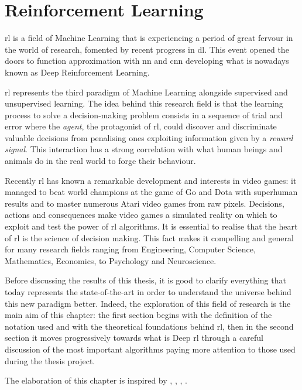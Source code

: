 
\chapter{Reinforcement Learning}

\acrfull{rl} is a field of Machine Learning that is experiencing a period of great fervour in the world of research, fomented by recent progress in \acrfull{dl}. This event opened the doors to function approximation with \acrfull{nn} and \acrfull{cnn} developing what is nowadays known as Deep Reinforcement Learning.

\acrshort{rl} represents the third paradigm of Machine Learning alongside supervised and unsupervised learning. The idea behind  this research field is that the learning process to solve a decision-making problem consists in a sequence of trial and error where the \textit{agent}, the protagonist of \acrshort{rl}, could discover and discriminate valuable decisions from penalising ones exploiting information given by a \textit{reward signal}. This interaction has a strong correlation with what human beings and animals do in the real world to forge their behaviour.

Recently \acrshort{rl} has known a remarkable development and interests in video games: it managed to beat world champions at the game of Go \cite{silver2016mastering} and Dota with superhuman results and to master numerous Atari video games \cite{mnih2013playing} from raw pixels. Decisions, actions and consequences make video games a simulated reality on which to exploit and test the power of \acrshort{rl} algorithms.
It is essential to realise that the heart of \acrshort{rl} is the science of decision making. This fact makes it compelling and general for many research fields ranging from Engineering, Computer Science, Mathematics, Economics, to Psychology and Neuroscience.

Before discussing the results of this thesis, it is good to clarify everything that today represents the state-of-the-art in order to understand the universe behind this new paradigm better. Indeed, the exploration of this field of research is the main aim of this chapter: the first section begins with the definition of the notation used and with the theoretical foundations behind \acrshort{rl}, then in the second section it moves  progressively towards what is Deep \acrshort{rl} through a careful discussion of the most important algorithms paying more attention to those used during the thesis project.

The elaboration of this chapter is inspired by \cite{silver2015lectures}, \cite{sutton2018reinforcement}, \cite{openai2018spinningup}, \cite{lapan2018deep}.

